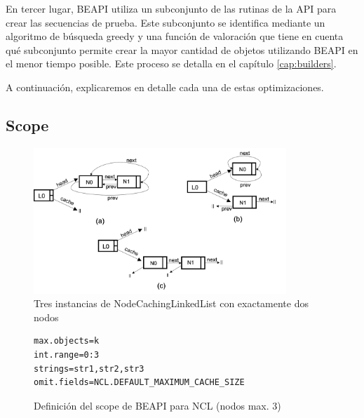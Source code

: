 En tercer lugar, \textsf{BEAPI} utiliza un subconjunto de las rutinas de la API para crear las secuencias de prueba.
Este subconjunto se identifica mediante un algoritmo de búsqueda greedy y una función de valoración que tiene en cuenta qué subconjunto permite crear la mayor cantidad de objetos utilizando \textsf{BEAPI} en el menor tiempo posible. Este proceso se detalla en el capítulo \ref{cap:builders}.

A continuación, explicaremos en detalle cada una de estas optimizaciones.

\subsection{Scope}
\label{sec:scope}

\begin{figure}[H]
    \centering
    \includegraphics[width=0.85\textwidth]{images/NCL-instances.png}
    \caption{Tres instancias de NodeCachingLinkedList con exactamente dos nodos}
    \label{fig:ncl-instances}
\end{figure}

\begin{figure}[H]
\begin{lstlisting}[keywordstyle=\scriptsize\ttfamily]
max.objects=k
int.range=0:3
strings=str1,str2,str3
omit.fields=NCL.DEFAULT_MAXIMUM_CACHE_SIZE
\end{lstlisting}
\caption{Definición del scope de BEAPI para NCL (nodos max. 3)}
\label{fig:NCL-fin-BEAPI}
\end{figure}

